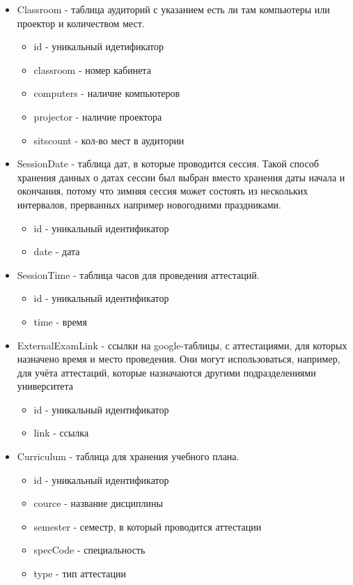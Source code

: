 \begin{itemize}
	\item Classroom - таблица аудиторий с указанием есть ли там компьютеры или проектор и количеством мест.
	\begin{itemize}
		\item id - уникальный идетификатор
		\item classroom - номер кабинета
		\item computers - наличие компьютеров
		\item projector - наличие проектора
		\item sitscount - кол-во мест в аудитории
	\end{itemize} 

	\item SessionDate - таблица дат, в которые проводится сессия. Такой способ хранения данных о датах сессии был выбран вместо хранения даты начала и окончания, потому что зимняя сессия может состоять из нескольких интервалов, прерванных например новогодними праздниками.
	\begin{itemize}
		\item id - уникальный идентификатор
		\item date - дата
	\end{itemize} 

	\item SessionTime - таблица часов для проведения аттестаций.
	\begin{itemize}
		\item id - уникальный идентификатор
		\item time - время
	\end{itemize} 	

	\item ExternalExamLink - ссылки на google-таблицы, с аттестациями, для которых назначено время и место проведения. Они могут использоваться, например, для учёта аттестаций, которые назначаются другими подразделениями университета
\begin{itemize}
	\item id - уникальный идентификатор
	\item link - ссылка
\end{itemize} 

	\item Curriculum - таблица для хранения учебного плана.
\begin{itemize}
	\item id - уникальный идентификатор
	\item cource - название дисциплины
	\item semester - семестр, в который проводится аттестации
	\item specCode - специальность
	\item type - тип аттестации
\end{itemize} 


\end{itemize}
